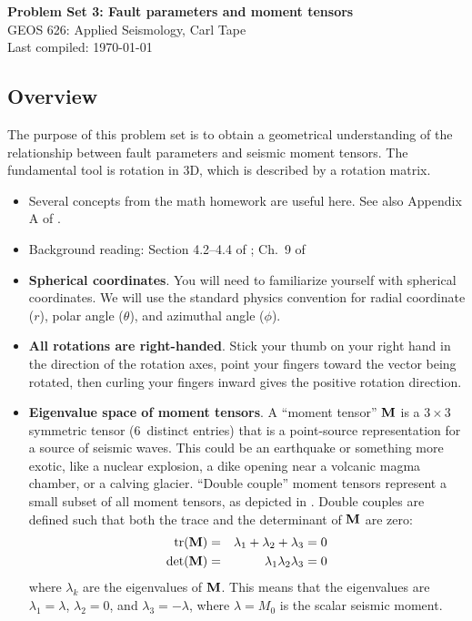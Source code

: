 \documentclass[11pt,titlepage,fleqn]{article}
\begin{document}

\begin{spacing}{1.2}
\centering
{\large \bf Problem Set 3: Fault parameters and moment tensors} \\
GEOS 626: Applied Seismology, Carl Tape \\
Last compiled: \today
\end{spacing}

\begin{spacing}{1.0}

\subsection*{Overview}

The purpose of this problem set is to obtain a geometrical understanding of the relationship between fault parameters and seismic moment tensors. The fundamental tool is rotation in 3D, which is described by a rotation matrix.

\begin{itemize}
\item Several concepts from the math homework are useful here. See also Appendix A of \citet{SteinWysession}.

\item Background reading: Section 4.2--4.4 of \citet{SteinWysession}; Ch.~9 of \citet{ShearerE2}

\item {\bf Spherical coordinates}. You will need to familiarize yourself with spherical coordinates. We will use the standard physics convention for radial coordinate ($r$), polar angle ($\theta$), and azimuthal angle ($\phi$).

\item {\bf All rotations are right-handed}. Stick your thumb on your right hand in the direction of the rotation axes, point your fingers toward the vector being rotated, then curling your fingers inward gives the positive rotation direction.

\item {\bf Eigenvalue space of moment tensors}. A ``moment tensor'' $\mbox{${\bf M}$}$ is a $3 \times 3$ symmetric tensor (6~distinct entries) that is a point-source representation for a source of seismic waves. This could be an earthquake or something more exotic, like a nuclear explosion, a dike opening near a volcanic magma chamber, or a calving glacier. ``Double couple'' moment tensors represent a small subset of all moment tensors, as depicted in . Double couples are defined such that both the trace and the determinant of $\mbox{${\bf M}$}$ are zero:
%
\begin{eqnarray*}
{\rm tr}(\mbox{${\bf M}$}) &=& \lambda_1 + \lambda_2 + \lambda_3 = 0
\\
\det(\mbox{${\bf M}$}) &=& \lambda_1 \lambda_2 \lambda_3 = 0
\end{eqnarray*}
%
where $\lambda_k$ are the eigenvalues of $\mbox{${\bf M}$}$. This means that the eigenvalues are $\lambda_1 = \lambda$, $\lambda_2 = 0$, and $\lambda_3 = -\lambda$, where $\lambda = M_0$ is the scalar seismic moment. 


\end{itemize}
\end{spacing}
\end{document}
